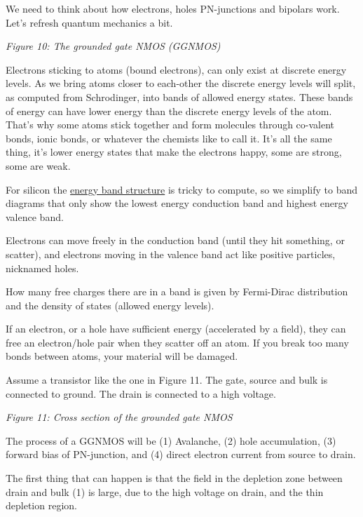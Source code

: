 We need to think about how electrons, holes PN-junctions and bipolars
work. Let's refresh quantum mechanics a bit.


{
\centering
{}
}

\emph{Figure 10: The grounded gate NMOS (GGNMOS) }

Electrons sticking to atoms (bound electrons), can only exist at
discrete energy levels. As we bring atoms closer to each-other the
discrete energy levels will split, as computed from Schrodinger, into
bands of allowed energy states. These bands of energy can have lower
energy than the discrete energy levels of the atom. That's why some
atoms stick together and form molecules through co-valent bonds, ionic
bonds, or whatever the chemists like to call it. It's all the same
thing, it's lower energy states that make the electrons happy, some are
strong, some are weak.

For silicon the
\href{https://www.iue.tuwien.ac.at/phd/wessner/node31.html}{energy band
structure} is tricky to compute, so we simplify to band diagrams that
only show the lowest energy conduction band and highest energy valence
band.

Electrons can move freely in the conduction band (until they hit
something, or scatter), and electrons moving in the valence band act
like positive particles, nicknamed holes.

How many free charges there are in a band is given by Fermi-Dirac
distribution and the density of states (allowed energy levels).

If an electron, or a hole have sufficient energy (accelerated by a
field), they can free an electron/hole pair when they scatter off an
atom. If you break too many bonds between atoms, your material will be
damaged.

Assume a transistor like the one in Figure 11. The gate, source and bulk
is connected to ground. The drain is connected to a high voltage.


{
\centering
{}
}

\emph{Figure 11: Cross section of the grounded gate NMOS }

The process of a GGNMOS will be (1) Avalanche, (2) hole accumulation,
(3) forward bias of PN-junction, and (4) direct electron current from
source to drain.

The first thing that can happen is that the field in the depletion zone
between drain and bulk (1) is large, due to the high voltage on drain,
and the thin depletion region.

